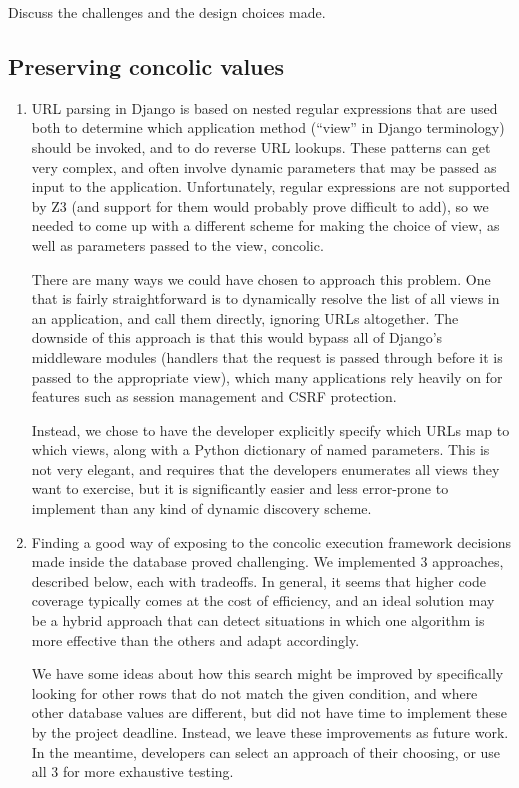 \documentclass{scrartcl}
\begin{document}
Discuss the challenges and the design choices made.

\subsection{Preserving concolic values}

\begin{enumerate}
\item URL parsing in Django is based on nested regular expressions that
  are used both to determine which application method (``view''
  in Django terminology) should be invoked, and to do reverse URL
  lookups. These patterns can get very complex, and often involve
  dynamic parameters that may be passed as input to the
  application. Unfortunately, regular expressions are not
  supported by Z3 (and support for them would probably prove
  difficult to add), so we needed to come up with a different
  scheme for making the choice of view, as well as parameters
  passed to the view, concolic.

  There are many ways we could have chosen to approach this
  problem. One that is fairly straightforward is to dynamically
  resolve the list of all views in an application, and call them
  directly, ignoring URLs altogether.  The downside of this
  approach is that this would bypass all of Django's middleware
  modules (handlers that the request is passed through before it
  is passed to the appropriate view), which many applications
  rely heavily on for features such as session management and
  CSRF protection.

  Instead, we chose to have the developer explicitly specify
  which URLs map to which views, along with a Python dictionary
  of named parameters. This is not very elegant, and requires
  that the developers enumerates all views they want to exercise,
  but it is significantly easier and less error-prone to
  implement than any kind of dynamic discovery scheme.

\item Finding a good way of exposing to the concolic execution framework
  decisions made inside the database proved challenging. We implemented 3
  approaches, described below, each with tradeoffs. In general, it seems
  that higher code coverage typically comes at the cost of efficiency, and an
  ideal solution may be a hybrid approach that can detect situations in which
  one algorithm is more effective than the others and adapt accordingly.

  We have some ideas about how this search might be improved by
  specifically looking for other rows that do not match the given
  condition, and where other database values are different, but
  did not have time to implement these by the project deadline.
  Instead, we leave these improvements as future work. In the
  meantime, developers can select an approach of their choosing, or use all 3
  for more exhaustive testing.


\end{enumerate}
\end{document}
